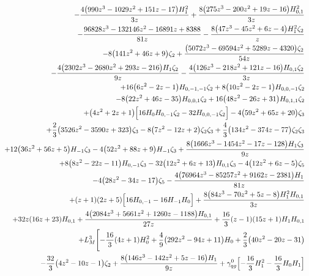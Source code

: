 \begin{eqnarray}
\nonumber \\ &&
-\frac{4 \big(990 z^3-1029 z^2+151 z-17\big) H_1^2}{3 z}
+\frac{8 \big(275  z^3-200 z^2+19 z-16\big) H_{0,1}^2}{3 z}
\nonumber \\ &&
-\frac{96828 z^3-132146 z^2-16891  z+8388}{81 z}-\frac{8 \big(47 z^3-45 z^2+6 z-4\big) H_1^2 \zeta_2}{z}
\nonumber \\ &&
-8 \big(141 z^2+46 z+9\big) \zeta_2+\frac{\big(5072 z^3-69594  z^2+5289 z-4320\big) \zeta_2}{54 z}
\nonumber \\ &&
-\frac{4 \big(2302 z^3-2680 z^2+293  z-216\big) H_1 \zeta_2}{9 z}-\frac{4 \big(126 z^3-218 z^2+121 z-16\big)  H_{0,1} \zeta_2}{3 z}
\nonumber \\ &&
+16  \big(6 z^2-2 z-1\big) H_{0,-1,-1}\zeta_2+8  \big(10 z^2-2 z-1\big) H_{0,0,-1} \zeta_2
\nonumber \\ &&
-8 \big(22z^2+46 z-35\big) H_{0,0,1} \zeta_2+16 \big(48 z^2-26 z+31\big) H_{0,1,1}\zeta_2
\nonumber \\ &&
+\big(4 z^2+2 z+1\big) \Bigl[16 H_0 H_{0,-1} \zeta_2-32H_{0,0,-1} \zeta_2\Bigr]-4  \big(59 z^2+65 z+20\big) \zeta_3
\nonumber \\ &&
+\frac{2}{3} \big(3526 z^2-3590 z+323\big) \zeta_3-8  \big(7z^2-12 z+2\big) \zeta_2 \zeta_3
+\frac{4}{3} \big(134 z^2-374z-77\big) \zeta_2 \zeta_3
\nonumber \\ &&
+12 \big(36 z^2+56 z+5\big) H_{-1}\zeta_3
-4  \big(52 z^2+88 z+9\big) H_{-1} \zeta_3+\frac{8  \big(1666 z^3-1454 z^2-17 z-128\big) H_1 \zeta_3}{9 z}
\nonumber \\ &&
+8 \big(8 z^2-22z-11\big) H_{0,-1} \zeta_3-32 \big(12 z^2+6 z+13\big) H_{0,1} \zeta_3-4  \big(12 z^2+6 z-5\big) \zeta_5
\nonumber \\ &&
-4 \big(28 z^2-34 z-17\big)\zeta_5-\frac{4 \big(76964 z^3-85257 z^2+9162 z-2381\big) H_1}{81  z}
\nonumber \\ &&
+(z+1) (2 z+5) \Bigl[16 H_{0,-1}-16 H_{-1} H_0\Bigr]+\frac{8 \big(84 z^3-70  z^2+5 z-8\big) H_1^2 H_{0,1}}{3 z}
\nonumber \\ &&
+32  z (16 z+23) H_{0,1}+\frac{4  \big(2084 z^3+5661 z^2+1260 z-1188\big) H_{0,1}}{27 z}+\frac{16}{3} (z-1)(15 z+1) H_1 H_{0,1}
\nonumber \\ &&
+L_M^3 \Biggl[-\frac{16}{3} (4 z+1) H_0^2+\frac{4}{9}\big(292 z^2-94 z+11\big) H_0+\frac{2}{3} \big(40 z^2-20z-31\big)
\nonumber \\ &&
-\frac{32}{3} \big(4 z^2-10 z-1\big) \zeta_2+\frac{8 \big(146  z^3-142 z^2+5 z-16\big) H_1}{9 z}+{\gamma}_{qg}^{0} \Bigl[-\frac{16}{3}H_1^2-\frac{16}{3} H_0 H_1\Bigr]

\end{eqnarray}

